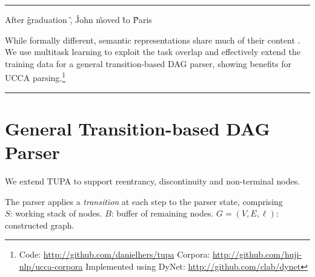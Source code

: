 \documentclass[a0,portrait]{a0poster}
\begin{document}
\begin{multicols}{2}
\begin{minipage}{.55\columnwidth}
\begin{center}
\begin{dependency}[edge style={-{Latex[length=4mm]}, color=blue},
        text only label, label style={above, color=blue}, font=\small]
    \end{dependency}
    \hrule
    \vfill
    \begin{dependency}[edge style={-{Latex[length=4mm]}, color=purple},
        text only label, label style={above, color=purple}, font=\small]
    \begin{deptext}[column sep=.8em,ampersand replacement=\^]
    After \^ graduation \^ , \^ John \^ moved \^ to \^ Paris \\
    \end{deptext}
    \end{dependency}
  \end{center}
\end{minipage}

While formally different, semantic representations
share much of their content \cite{abend2017state}.
We use multitask learning to exploit the task overlap
and effectively extend the training data
for a general transition-based DAG parser,
showing benefits for UCCA parsing.\footnote{Code:
\url{http://github.com/danielhers/tupa} \hfill
Corpora: \url{http://github.com/huji-nlp/ucca-corpora} \hfill
Implemented using DyNet: \url{http://github.com/clab/dynet}}

\hrule

\section*{General Transition-based DAG Parser}

We extend TUPA \cite{hershcovich2017a} to support
reentrancy, discontinuity and non-terminal nodes.

The parser applies a \textit{transition}
at each step to the parser state, comprising\\
$S$: working stack of nodes.
$B$: buffer of remaining nodes.
$G=(V,E,\ell)$: constructed graph.


\end{multicols}
\end{document}

